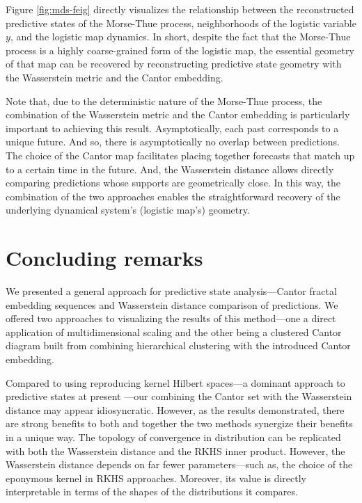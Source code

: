 \documentclass[draft,aps,pre,twocolumn,groupaddress,showkeys,nofootinbib,preprintnumbers,floatfix]{revtex4-2}
\begin{document}
Figure \ref{fig:mds-feig} directly visualizes the relationship between the
reconstructed predictive states of the Morse-Thue process, neighborhoods of the
logistic variable $y$, and the logistic map dynamics. In short, despite the
fact that the Morse-Thue process is a highly coarse-grained form of the
logistic map, the essential geometry of that map can be recovered by
reconstructing predictive state geometry with the Wasserstein metric and the
Cantor embedding.

Note that, due to the deterministic nature of the Morse-Thue process, the
combination of the Wasserstein metric and the Cantor embedding is particularly
important to achieving this result. Asymptotically, each past corresponds to a
unique future. And so, there is asymptotically no overlap between predictions.
The choice of the Cantor map facilitates placing together forecasts that match
up to a certain time in the future. And, the Wasserstein distance allows
directly comparing predictions whose supports are geometrically close. In this
way, the combination of the two approaches enables the straightforward recovery
of the underlying dynamical system's (logistic map's) geometry.

\section{Concluding remarks}

We presented a general approach for predictive state analysis---Cantor fractal
embedding sequences and Wasserstein distance comparison of predictions. We
offered two approaches to visualizing the results of this method---one a direct
application of multidimensional scaling and the other being a clustered Cantor
diagram built from combining hierarchical clustering with the introduced Cantor
embedding.

Compared to using reproducing kernel Hilbert spaces---a dominant approach to
predictive states at present
\cite{Song09a,Song10a,Boot13a,Brod20a,Loom21a}---our combining the Cantor set
with the Wasserstein distance may appear idiosyncratic. However, as the results
demonstrated, there are strong benefits to both and together the two methods
synergize their benefits in a unique way. The topology of convergence in
distribution can be replicated with both the Wasserstein distance and the RKHS
inner product. However, the Wasserstein distance depends on far fewer
parameters---such as, the choice of the eponymous kernel in RKHS approaches.
Moreover, its value is directly interpretable in terms of the shapes of the
distributions it compares.
\end{document}
